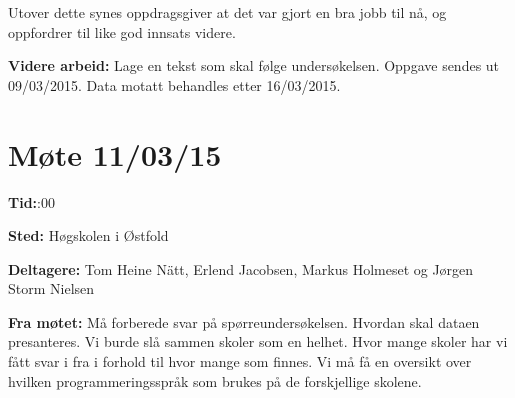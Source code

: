 Utover dette synes oppdragsgiver at det var gjort en bra jobb til nå, og oppfordrer til like god innsats videre.

\vspace{20pt}

\hspace{-17pt}\textbf{Videre arbeid:}\newline
Lage en tekst som skal følge undersøkelsen.\newline
Oppgave sendes ut 09/03/2015.\newline
Data motatt behandles etter 16/03/2015.\newline

\newpage




\section{Møte 11/03/15}


\vspace{30pt}
\textbf{Tid:}:00\newline 

\hspace{-17pt}\textbf{Sted:}\newline 
Høgskolen i Østfold
\newline

\hspace{-17pt}\textbf{Deltagere:}\newline 
Tom Heine Nätt, Erlend Jacobsen, Markus Holmeset og Jørgen Storm Nielsen\newline
\newline

\hspace{-17pt}\textbf{Fra møtet:}\newline
Må forberede svar på spørreundersøkelsen. Hvordan skal dataen presanteres.
Vi burde slå sammen skoler som en helhet.\newline
Hvor mange skoler har vi fått svar i fra i forhold til hvor mange som finnes.\newline
Vi må få en oversikt over hvilken programmeringsspråk som brukes på de forskjellige skolene.\newline

